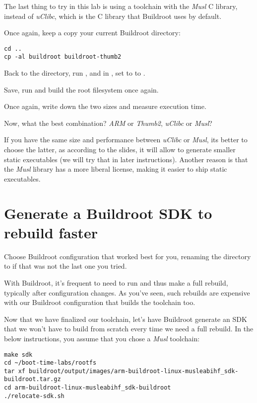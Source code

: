 The last thing to try in this lab is using a toolchain with the {\em
Musl} C library, instead of {\em uClibc}, which is the C library that
Buildroot uses by default.

Once again, keep a copy your current Buildroot directory:
\begin{verbatim}
cd ..
cp -al buildroot buildroot-thumb2
\end{verbatim}

Back to the  directory, run , and
in , set  to to .

Save, run  and build the root filesystem once again.

Once again, write down the two sizes and measure  execution
time.

Now, what the best combination? {\em ARM} or {\em Thumb2},
{\em uClibc} or {\em Musl}?

If you have the same size and performance between {\em uClibc} or {\em
Musl}, its better to choose the latter, as according to the slides, it
will allow to generate smaller static executables (we will try that
in later instructions). Another reason is that the {\em Musl} library
has a more liberal license, making it easier to ship static executables.

\section{Generate a Buildroot SDK to rebuild faster}

Choose Buildroot configuration that worked best for you, renaming
the directory to  if that was not the last one you
tried.

With Buildroot, it's frequent to need to run  and
thus make a full rebuild, typically after configuration changes.
As you've seen, such rebuilds are expensive with our Buildroot
configuration that builds the toolchain too.

Now that we have finalized our toolchain, let's have Buildroot generate
an SDK that we won't have to build from scratch every time we need a
full rebuild. In the below instructions, you assume that you chose a
{\em Musl} toolchain:

\begin{verbatim}
make sdk
cd ~/boot-time-labs/rootfs
tar xf buildroot/output/images/arm-buildroot-linux-musleabihf_sdk-buildroot.tar.gz
cd arm-buildroot-linux-musleabihf_sdk-buildroot
./relocate-sdk.sh
\end{verbatim}

